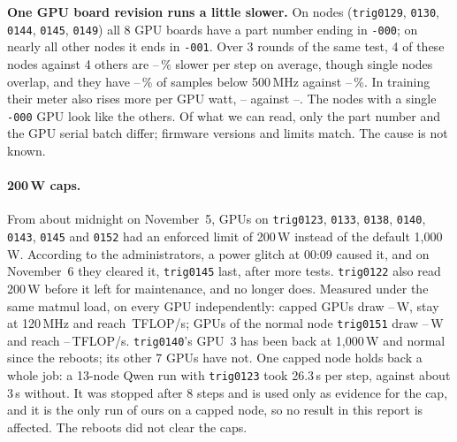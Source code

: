 \textbf{One GPU board revision runs a little slower.} On \TriBoardNodes{} nodes (\texttt{trig0129}, \texttt{0130}, \texttt{0144}, \texttt{0145}, \texttt{0149}) all 8 GPU boards have a part number ending in \texttt{-000}; on nearly all other nodes it ends in \texttt{-001}. Over 3 rounds of the same test, 4 of these nodes against 4 others are \TriBoardStepLo--\TriBoardStepHi\,\% slower per step on average, though single nodes overlap, and they have \TriBoardLowOldLo--\TriBoardLowOldHi\,\% of samples below 500\,MHz against \TriBoardLowCtlLo--\TriBoardLowCtlHi\,\%. In training their meter also rises more per GPU watt, \TriBoardSlopeLo--\TriBoardSlopeHi{} against \TriBoardRestSlopeLo--\TriBoardRestSlopeHi. The \TriBoardMixed{} nodes with a single \texttt{-000} GPU look like the others. Of what we can read, only the part number and the GPU serial batch differ; firmware versions and limits match. The cause is not known.

\paragraph{200\,W caps.} From about midnight on November~5, GPUs on \texttt{trig0123}, \texttt{0133}, \texttt{0138}, \texttt{0140}, \texttt{0143}, \texttt{0145} and \texttt{0152}
had an enforced limit of 200\,W instead of the default 1,000\,W. According to the administrators, a power glitch at 00:09 caused it, and on November~6 they cleared it, \texttt{trig0145} last, after more tests. \texttt{trig0122} also read 200\,W before it left for maintenance, and no longer does. Measured under the same matmul load, on every GPU independently: capped GPUs draw \TriCapPowerLo--\TriCapPowerHi\,W, stay at
120\,MHz and reach \TriCapTFlops\,TFLOP/s; GPUs of the normal node \texttt{trig0151} draw \TriCapControlPowerLo--\TriCapControlPowerHi\,W and reach \TriCapControlLo--\TriCapControlHi\,TFLOP/s. \texttt{trig0140}'s
GPU~3 has been back at 1,000\,W and normal since the reboots; its other 7 GPUs have not. One capped node holds back a whole job: a 13-node Qwen run with \texttt{trig0123} took 26.3\,s per step, against about
3\,s without. It was stopped after 8 steps and is used only as evidence for the cap, and it is the only run of ours on a capped node, so no result in this report is affected. The reboots did not clear the caps.

